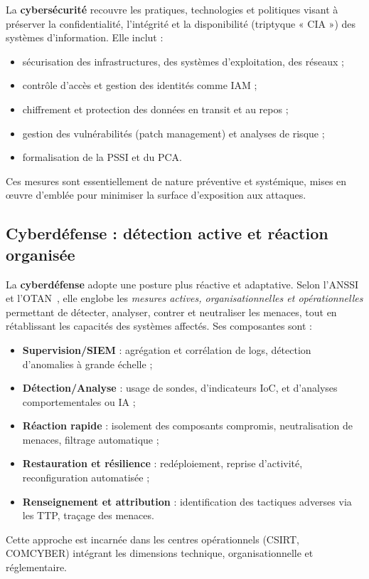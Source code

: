 \documentclass[ twoside,openright,titlepage,numbers=noenddot,headinclude,%
                footinclude=true,cleardoublepage=empty,abstractoff, %
                BCOR=5mm,paper=a4,fontsize=11pt,%
                french,american,%
                ]{scrreprt}
\begin{document}
La \textbf{cybersécurité} recouvre les pratiques, technologies et politiques visant à préserver la confidentialité, l'intégrité et la disponibilité (triptyque « CIA ») des systèmes d'information. Elle inclut :
\begin{itemize}
    \item sécurisation des infrastructures, des systèmes d'exploitation, des réseaux ;
    \item contrôle d'accès et gestion des identités comme \ac{IAM} ;
    \item chiffrement et protection des données en transit et au repos ;
    \item gestion des vulnérabilités (patch management) et analyses de risque ;
    \item formalisation de la \ac{PSSI} et du \ac{PCA}.
\end{itemize}
Ces mesures sont essentiellement de nature préventive et systémique, mises en œuvre d'emblée pour minimiser la surface d'exposition aux attaques.

\subsection*{Cyberdéfense : détection active et réaction organisée}

La \textbf{cyberdéfense} adopte une posture plus réactive et adaptative. Selon l'ANSSI et l'OTAN~\cite{ANSSI2020,NATO2016Cyberdef}, elle englobe les \emph{mesures actives, organisationnelles et opérationnelles} permettant de détecter, analyser, contrer et neutraliser les menaces, tout en rétablissant les capacités des systèmes affectés. Ses composantes sont :
\begin{itemize}
    \item \textbf{Supervision/SIEM} : agrégation et corrélation de logs, détection d'anomalies à grande échelle ;
    \item \textbf{Détection/Analyse} : usage de sondes, d'indicateurs IoC, et d'analyses comportementales ou IA ;
    \item \textbf{Réaction rapide} : isolement des composants compromis, neutralisation de menaces, filtrage automatique ;
    \item \textbf{Restauration et résilience} : redéploiement, reprise d'activité, reconfiguration automatisée ;
    \item \textbf{Renseignement et attribution} : identification des tactiques adverses via les \ac{TTP}, traçage des menaces.
\end{itemize}
Cette approche est incarnée dans les centres opérationnels (CSIRT, COMCYBER) intégrant les dimensions technique, organisationnelle et réglementaire.
\end{document}
